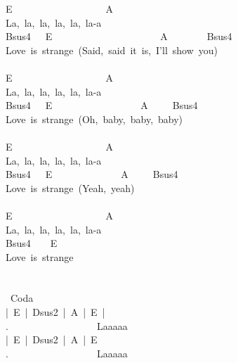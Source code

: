 {E\ \ \ \ \ \ \ \ \ \ \ \ \ \ \ \ \ \ \ A\\
La,\ la,\ la,\ la,\ la,\ la-a\\
Bsus4\ \ \ E\ \ \ \ \ \ \ \ \ \ \ \ \ \ \ \ \ \ \ \ \ \ A\ \ \ \ \ \ \ \ Bsus4\ \\
Love\ is\ strange\ (Said,\ said\ it\ is,\ I'll\ show\ you)\\
\\
E\ \ \ \ \ \ \ \ \ \ \ \ \ \ \ \ \ \ \ A\\
La,\ la,\ la,\ la,\ la,\ la-a\\
Bsus4\ \ \ E\ \ \ \ \ \ \ \ \ \ \ \ \ \ \ \ \ \ A\ \ \ \ \ Bsus4\ \\
Love\ is\ strange\ (Oh,\ baby,\ baby,\ baby)\\
\\
E\ \ \ \ \ \ \ \ \ \ \ \ \ \ \ \ \ \ \ A\\
La,\ la,\ la,\ la,\ la,\ la-a\\
Bsus4\ \ \ E\ \ \ \ \ \ \ \ \ \ \ \ \ \ A\ \ \ \ \ Bsus4\ \\
Love\ is\ strange\ (Yeah,\ yeah)\\
\\
E\ \ \ \ \ \ \ \ \ \ \ \ \ \ \ \ \ \ \ A\\
La,\ la,\ la,\ la,\ la,\ la-a\\
Bsus4\ \ \lbrack\ \ E\ \rbrack\\
Love\ is\ strange\\
\\
\\
\lbrack\ Coda\rbrack\\
|\ E\ |\ Dsus2\ |\ A\ |\ E\ |\\
.\ \ \ \ \ \ \ \ \ \ \ \ \ \ \ \ \ \ Laaaaa\\
|\ E\ |\ Dsus2\ |\ A\ |\ E\ \\
.\ \ \ \ \ \ \ \ \ \ \ \ \ \ \ \ \ \ Laaaaa}
